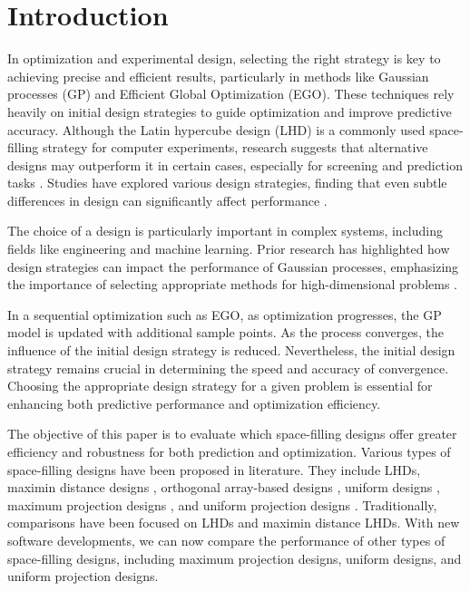 \documentclass [PhD] {package/uclathes}
\begin{document}
\section{Introduction}



In optimization and experimental design, selecting the right strategy is key to achieving precise and efficient results, particularly in methods like Gaussian processes (GP) and Efficient Global Optimization (EGO). These techniques rely heavily on initial design strategies to guide optimization and improve predictive accuracy. Although the Latin hypercube design (LHD) \parencite{mckay1979comparison} is a commonly used space-filling strategy for computer experiments, research suggests that alternative designs may outperform it in certain cases, especially for screening and prediction tasks \parencite{welch1992screening}. Studies have explored various design strategies, finding that even subtle differences in design can significantly affect performance \parencite{chen2016analysis}.

The choice of a design is particularly important in complex systems, including fields like engineering and machine learning. Prior research has highlighted how design strategies can impact the performance of Gaussian processes, emphasizing the importance of selecting appropriate methods for high-dimensional problems \parencite{harari2014optimal}.

In a sequential optimization such as EGO, as optimization progresses, the GP model is updated with additional sample points. As the process converges, the influence of the initial design strategy is reduced. Nevertheless, the initial design strategy remains crucial in determining the speed and accuracy of convergence. Choosing the appropriate design strategy for a given problem is essential for enhancing both predictive performance and optimization efficiency.

The objective of this paper is to evaluate which space-filling designs offer greater efficiency and robustness for both prediction and optimization.
Various types of space-filling designs have been proposed in literature. They include LHDs, maximin distance designs \parencite{johnson1990minimax, morris1995exploratory}, orthogonal array-based designs \parencite{tang1993orthogonal, xiao2018construction}, uniform designs \parencite{fang2000uniform}, maximum projection designs \parencite{joseph2015maximum}, and uniform projection designs \parencite{sun2019uniform}.
Traditionally, comparisons have been focused on LHDs and maximin distance LHDs. With new software developments, we can now compare the performance of other types of space-filling designs, including maximum projection designs, uniform designs, and uniform projection designs.
\end{document}
